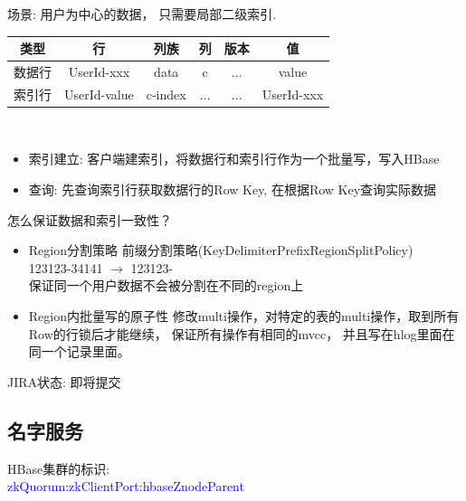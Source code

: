 \documentclass[xcolor=table]{beamer}
\begin{document}
\begin{CJK}{UTF8}{gkai}
\begin{frame}{\subsecname}
 	场景: 用户为中心的数据， 只需要局部二级索引. \\

	\bigskip
	\begin{tabular}{|c|c|c|c|c|c|}
		\rowcolor{gray!50}
		\hline
		类型 & 行 & 列族 & 列 & 版本 & 值 \\
		\hline
		数据行 & UserId-xxx &  data &  c & ... &  value \\
		\rowcolor{green}
		\hline
		索引行 & UserId-value & c-index & ... & ... & UserId-xxx \\
		\hline
	\end{tabular}
	\\
	\bigskip
	\begin{itemize}
		\item 索引建立: 客户端建索引，将数据行和索引行作为一个批量写，写入HBase
		\item 查询: 先查询索引行获取数据行的Row Key, 在根据Row Key查询实际数据
	\end{itemize}
\end{frame}

\begin{frame}{\subsecname}
	怎么保证数据和索引一致性？
	\begin{itemize}
		\item \begin{block}{Region分割策略}
					前缀分割策略(KeyDelimiterPrefixRegionSplitPolicy) \\
					123123-34141 $\rightarrow$ 123123- \\
					保证同一个用户数据不会被分割在不同的region上
					\end{block}
		\item \begin{block}{Region内批量写的原子性}
					修改multi操作，对特定的表的multi操作，取到所有Row的行锁后才能继续，
					保证所有操作有相同的mvcc， 并且写在hlog里面在同一个记录里面。
					\end{block}
	\end{itemize}

	JIRA状态: 即将提交
\end{frame}

\subsection{名字服务}
\begin{frame}{\subsecname}
HBase集群的标识: \\
\bigskip
\textcolor{blue}{zkQuorum:zkClientPort:hbaseZnodeParent} \\


\end{frame}
\end{CJK}
\end{document}
